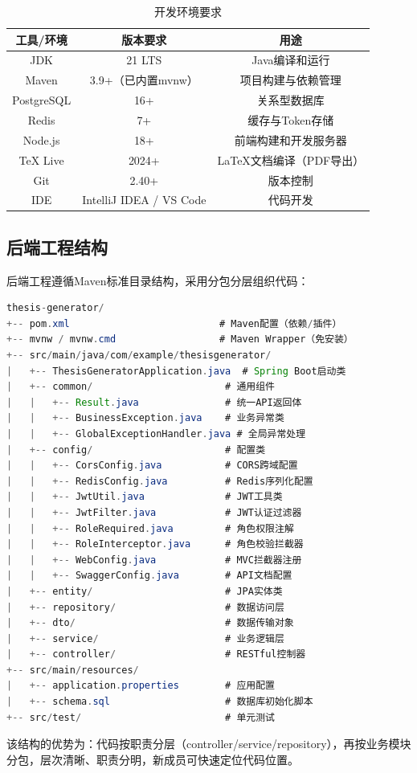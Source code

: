 \begin{table}[htbp]
    \centering
    \caption{开发环境要求}
    \begin{tabular}{|c|c|c|}
        \hline
        \textbf{工具/环境} & \textbf{版本要求} & \textbf{用途} \\
        \hline
        JDK & 21 LTS & Java编译和运行 \\
        \hline
        Maven & 3.9+（已内置mvnw） & 项目构建与依赖管理 \\
        \hline
        PostgreSQL & 16+ & 关系型数据库 \\
        \hline
        Redis & 7+ & 缓存与Token存储 \\
        \hline
        Node.js & 18+ & 前端构建和开发服务器 \\
        \hline
        TeX Live & 2024+ & LaTeX文档编译（PDF导出） \\
        \hline
        Git & 2.40+ & 版本控制 \\
        \hline
        IDE & IntelliJ IDEA / VS Code & 代码开发 \\
        \hline
    \end{tabular}
\end{table}

\subsection{后端工程结构}

后端工程遵循Maven标准目录结构，采用分包分层组织代码：

\begin{lstlisting}[language=Java,caption={后端工程目录结构}]
thesis-generator/
+-- pom.xml                          # Maven配置（依赖/插件）
+-- mvnw / mvnw.cmd                  # Maven Wrapper（免安装）
+-- src/main/java/com/example/thesisgenerator/
|   +-- ThesisGeneratorApplication.java  # Spring Boot启动类
|   +-- common/                       # 通用组件
|   |   +-- Result.java               # 统一API返回体
|   |   +-- BusinessException.java    # 业务异常类
|   |   +-- GlobalExceptionHandler.java # 全局异常处理
|   +-- config/                       # 配置类
|   |   +-- CorsConfig.java           # CORS跨域配置
|   |   +-- RedisConfig.java          # Redis序列化配置
|   |   +-- JwtUtil.java              # JWT工具类
|   |   +-- JwtFilter.java            # JWT认证过滤器
|   |   +-- RoleRequired.java         # 角色权限注解
|   |   +-- RoleInterceptor.java      # 角色校验拦截器
|   |   +-- WebConfig.java            # MVC拦截器注册
|   |   +-- SwaggerConfig.java        # API文档配置
|   +-- entity/                       # JPA实体类
|   +-- repository/                   # 数据访问层
|   +-- dto/                          # 数据传输对象
|   +-- service/                      # 业务逻辑层
|   +-- controller/                   # RESTful控制器
+-- src/main/resources/
|   +-- application.properties        # 应用配置
|   +-- schema.sql                    # 数据库初始化脚本
+-- src/test/                         # 单元测试
\end{lstlisting}

该结构的优势为：代码按职责分层（controller/service/repository），再按业务模块分包，层次清晰、职责分明，新成员可快速定位代码位置。
